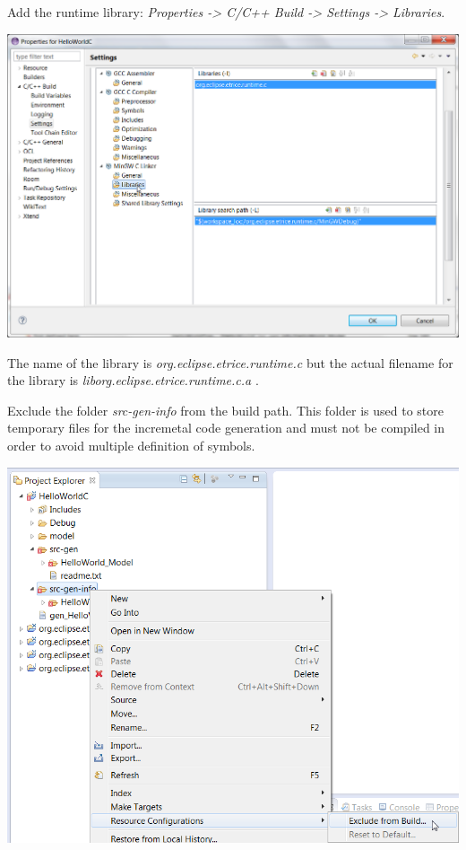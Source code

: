 Add the runtime library: \textit{Properties -> C/C++ Build -> Settings -> Libraries}.

\includegraphics{images/016-HelloWorldC15.png}

The name of the library is \emph{org.eclipse.etrice.runtime.c} but the actual filename for the library is \emph{liborg.eclipse.etrice.runtime.c.a} .

Exclude the folder \emph{src-gen-info} from the build path. This folder is used to store temporary files for the incremetal code generation and must not be compiled in order to avoid multiple definition of symbols.

\includegraphics{images/016-HelloWorldC151.png}

